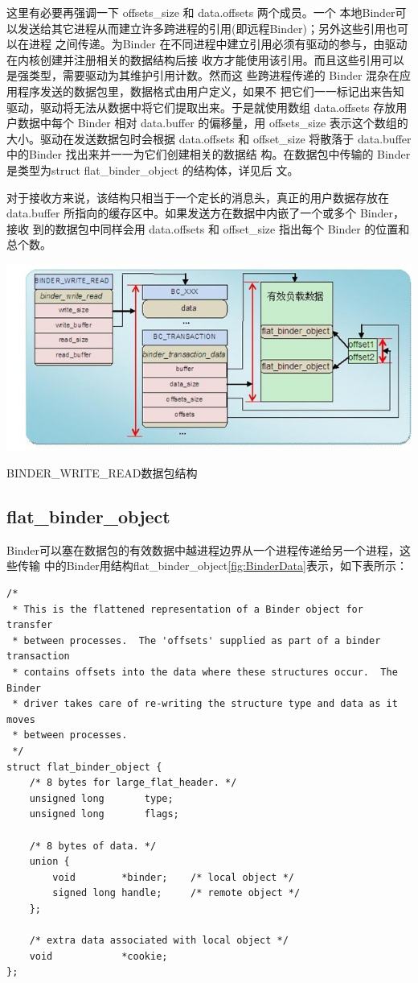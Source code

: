 \documentclass[a4paper,11pt]{article}
\begin{document}
这里有必要再强调一下 offsets_size 和 data.offsets 两个成员。一个
本地Binder可以发送给其它进程从而建立许多跨进程的引用(即远程Binder)；另外这些引用也可以在进程
之间传递。为Binder
在不同进程中建立引用必须有驱动的参与，由驱动在内核创建并注册相关的数据结构后接
收方才能使用该引用。而且这些引用可以是强类型，需要驱动为其维护引用计数。然而这
些跨进程传递的 Binder 混杂在应用程序发送的数据包里，数据格式由用户定义，如果不
把它们一一标记出来告知驱动，驱动将无法从数据中将它们提取出来。于是就使用数组
data.offsets 存放用户数据中每个 Binder 相对 data.buffer 的偏移量，用
offsets_size 表示这个数组的大小。驱动在发送数据包时会根据 data.offsets 和
offset_size 将散落于 data.buffer 中的Binder 找出来并一一为它们创建相关的数据结
构。在数据包中传输的 Binder 是类型为struct flat_binder_object 的结构体，详见后
文\label{BinderTransStructure}。

对于接收方来说，该结构只相当于一个定长的消息头，真正的用户数据存放在
data.buffer 所指向的缓存区中。如果发送方在数据中内嵌了一个或多个 Binder，接收
到的数据包中同样会用 data.offsets 和 offset_size 指出每个 Binder
的位置和总个数。

\begin{minipage}{0.9\linewidth}
\includegraphics[scale=0.66]{binderproto.jpg}

\caption{ BINDER_WRITE_READ数据包结构\label{fig:BinderData}}
\end{minipage}

\subsection{flat_binder_object}
Binder可以塞在数据包的有效数据中越进程边界从一个进程传递给另一个进程，这些传输
中的Binder用结构flat_binder_object\ref{fig:BinderData}表示，如下表所示： 

\begin{lstlisting}[caption={flat\_binder\_object}, label=flatbinderobject]
/*
 * This is the flattened representation of a Binder object for transfer
 * between processes.  The 'offsets' supplied as part of a binder transaction
 * contains offsets into the data where these structures occur.  The Binder
 * driver takes care of re-writing the structure type and data as it moves
 * between processes.
 */
struct flat_binder_object {
	/* 8 bytes for large_flat_header. */
	unsigned long		type;
	unsigned long		flags;

	/* 8 bytes of data. */
	union {
		void		*binder;	/* local object */
		signed long	handle;		/* remote object */
	};

	/* extra data associated with local object */
	void			*cookie;
};

\end{lstlisting}
\end{document}
